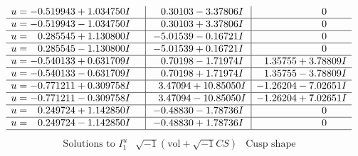 \documentclass[1p]{elsarticle_modified}
\theoremstyle{definition}
\newcommand{\I}{\sqrt{-1}}
\begin{document}
$$\begin{array}{c|c|c}
\begin{aligned}
u &= -0.519943 + 1.034750 I\end{aligned}
 & \phantom{-}0.30103 - 3.37806 I & \phantom{-0.000000 } 0 \\ \hline\begin{aligned}
u &= -0.519943 - 1.034750 I\end{aligned}
 & \phantom{-}0.30103 + 3.37806 I & \phantom{-0.000000 } 0 \\ \hline\begin{aligned}
u &= \phantom{-}0.285545 + 1.130800 I\end{aligned}
 & -5.01539 - 0.16721 I & \phantom{-0.000000 } 0 \\ \hline\begin{aligned}
u &= \phantom{-}0.285545 - 1.130800 I\end{aligned}
 & -5.01539 + 0.16721 I & \phantom{-0.000000 } 0 \\ \hline\begin{aligned}
u &= -0.540133 + 0.631709 I\end{aligned}
 & \phantom{-}0.70198 - 1.71974 I & \phantom{-}1.35755 + 3.78809 I \\ \hline\begin{aligned}
u &= -0.540133 - 0.631709 I\end{aligned}
 & \phantom{-}0.70198 + 1.71974 I & \phantom{-}1.35755 - 3.78809 I \\ \hline\begin{aligned}
u &= -0.771211 + 0.309758 I\end{aligned}
 & \phantom{-}3.47094 + 10.85050 I & -1.26204 - 7.02651 I \\ \hline\begin{aligned}
u &= -0.771211 - 0.309758 I\end{aligned}
 & \phantom{-}3.47094 - 10.85050 I & -1.26204 + 7.02651 I \\ \hline\begin{aligned}
u &= \phantom{-}0.249724 + 1.142850 I\end{aligned}
 & -0.48830 - 1.78736 I & \phantom{-0.000000 } 0 \\ \hline\begin{aligned}
u &= \phantom{-}0.249724 - 1.142850 I\end{aligned}
 & -0.48830 + 1.78736 I & \phantom{-0.000000 } 0\\
 \hline 
 \end{array}$$\newpage$$\begin{array}{c|c|c}  
\text{Solutions to }I^u_{1}& \I (\text{vol} + \sqrt{-1}CS) & \text{Cusp shape}\\

\end{array}$$
\end{document}
